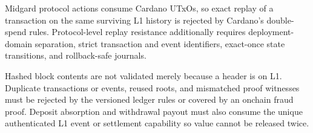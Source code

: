 \documentclass[../midgard.tex]{subfiles}
\begin{document}
Midgard protocol actions consume Cardano UTxOs, so exact replay of a transaction on the same surviving L1 history is rejected by Cardano's double-spend rules.
Protocol-level replay resistance additionally requires deployment-domain separation, strict transaction and event identifiers, exact-once state transitions, and rollback-safe journals.

Hashed block contents are not validated merely because a header is on L1.
Duplicate transactions or events, reused roots, and mismatched proof witnesses must be rejected by the versioned ledger rules or covered by an onchain fraud proof.
Deposit absorption and withdrawal payout must also consume the unique authenticated L1 event or settlement capability so value cannot be released twice.
\end{document}
